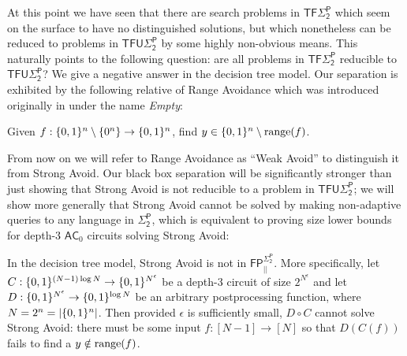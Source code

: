 At this point we have seen that there are search problems in $\mathsf{TF\Sigma_2^P}$ which seem on the surface to have no distinguished solutions, but which nonetheless can be reduced to problems in $\mathsf{TFU\Sigma_2^P}$ by some highly non-obvious means. This naturally points to the following question: are all problems in $\mathsf{TF\Sigma_2^P}$ reducible to $\mathsf{TFU\Sigma_2^P}$? We give a negative answer in the decision tree model. Our separation is exhibited by the following relative of Range Avoidance which was introduced originally in \cite{KKMP} under the name \emph{{\sc Empty}}:
\begin{definition}
Given $f: \{0,1\}^n \setminus \{0^n\} \to \{0,1\}^n$, find $y \in \{0,1\}^n \setminus \mathrm{range}(f)$.
\end{definition}
From now on we will refer to Range Avoidance as ``{\sc Weak Avoid}'' to distinguish it from {\sc Strong Avoid}. Our black box separation will be significantly stronger than just showing that {\sc Strong Avoid} is not reducible to a problem in $\mathsf{TFU\Sigma_2^P}$; we will show more generally that {\sc Strong Avoid} cannot be solved by making non-adaptive queries to any language in $\mathsf{\Sigma_2^P}$, which is equivalent to proving size lower bounds for depth-3 $\mathsf{AC}_0$ circuits solving {\sc Strong Avoid}: 

\begin{theorem}\label{thm:strongavoid-lb}

In the decision tree model, {\sc Strong Avoid} is not in $\mathsf{FP_{||}^{\Sigma_2^P}}$. More specifically, let ${C:\{0,1\}^{(N-1) \log N } \to \{0,1\}^{N^{\epsilon}}}$ be a depth-3 circuit of size $2^{N^{\epsilon}}$  and let $D: \{0,1\}^{N^{\epsilon}} \to \{0,1\}^{ \log N}$ be an arbitrary postprocessing function, where $N=2^n = |\{0,1\}^n|$. Then provided $\epsilon$ is sufficiently small, $D \circ C$ cannot solve {\sc Strong Avoid}: there must be some input $f: [N-1] \to [N]$ so that $D(C(f))$ fails to find a $y \notin \mathrm{range}(f)$.
\end{theorem}

